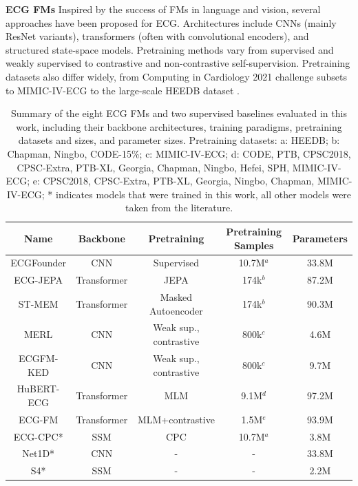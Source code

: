 \documentclass{article}
\newcommand{\heading}[1]{\noindent\textbf{#1}}
\begin{document}
    
    \heading{ECG FMs} Inspired by the success of FMs in language and vision, several approaches have been proposed for ECG. Architectures include CNNs (mainly ResNet variants), transformers (often with convolutional encoders), and structured state-space models. Pretraining methods vary from supervised and weakly supervised to contrastive and non-contrastive self-supervision. Pretraining datasets also differ widely, from Computing in Cardiology 2021 challenge subsets \citep{reyna2021will} to MIMIC-IV-ECG \citep{gow2023mimicivecg} to the large-scale HEEDB dataset \citep{koscova2024harvard}.

    \begin{table}[htbp]
        \centering
        \setlength{\tabcolsep}{3pt}
        \caption{Summary of the eight ECG FMs and two supervised baselines evaluated in this work, including their backbone architectures, training paradigms, pretraining datasets and sizes, and parameter sizes. Pretraining datasets: a: HEEDB; b: Chapman, Ningbo, CODE-15\%; c: MIMIC-IV-ECG; d: CODE, PTB, CPSC2018, CPSC-Extra, PTB-XL, Georgia, Chapman, Ningbo, Hefei, SPH, MIMIC-IV-ECG; e: CPSC2018, CPSC-Extra, PTB-XL, Georgia, Ningbo, Chapman, MIMIC-IV-ECG; * indicates models that were trained in this work, all other models were taken from the literature.}
        \begin{tabular}{ccccc}
            \toprule
            \textbf{Name} & \textbf{Backbone} & \textbf{Pretraining} & \textbf{Pretraining Samples} & \textbf{Parameters} \\
            \midrule
            ECGFounder & CNN & Supervised & 10.7M${}^a$ & 33.8M \\
            ECG-JEPA  & Transformer & JEPA &  174k${}^b$ & 87.2M \\
            ST-MEM & Transformer & Masked Autoencoder &  174k${}^b$ & 90.3M \\
            MERL  & CNN & Weak sup., contrastive & 800k${}^c$ & 4.6M \\
            ECGFM-KED & CNN & Weak sup., contrastive &  800k${}^c$ & 9.7M \\
            HuBERT-ECG  & Transformer & MLM & 9.1M${}^d$ & 97.2M \\
            ECG-FM  & Transformer & MLM+contrastive & 1.5M${}^e$& 93.9M \\
            ECG-CPC*  & SSM & CPC & 10.7M${}^a$& 3.8M \\
            \midrule
            Net1D* & CNN & - & - &  33.8M \\
            S4* & SSM & - & - &  2.2M \\   
            \bottomrule
        \end{tabular}
        \label{tab:ecg_models}
    \end{table}
\end{document}

